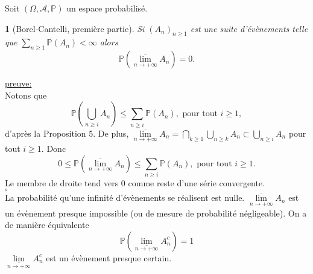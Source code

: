 \documentclass[8pt,notheorems]{beamer}
\def \P {\mathbb P}
\def \limsup{\underset{n\rightarrow+\infty}{\overline{\lim}}}
\def \liminf{\underset{n\rightarrow+\infty}{\underline{\lim}}}
\newtheorem{lemma}{\translate{Lemme}}
\theoremstyle{definition}
\theoremstyle{example}
\theoremstyle{mystyle}
\theoremstyle{plain}
\begin{document}
\begin{frame}[allowframebreaks]
Soit $(\Omega,\mathcal{A},\mathbb{P})$ un espace probabilisé. 
\begin{lemma}[Borel-Cantelli, première partie]
Si $(A_n)_{n\geq 1}$ est une suite d'évènements telle que $\sum_{n\geq1}\mathbb{P}(A_n)<\infty$ alors 
$$
\mathbb{P}\left(\limsup A_n\right)= 0.
$$
\end{lemma}
\underline{preuve:}\\
Notons que 
$$
\mathbb{P}(\bigcup_{n\geq i}A_n)\leq \sum_{n\geq i }\P(A_n),\text{ pour tout }i\geq 1,
$$
d'après la Proposition 5. De plus, 
$\limsup A_n  = \bigcap_{k\geq 1}\bigcup_{n\geq k}A_n\subset \bigcup_{n\geq i}A_n$ pour tout $i\geq1$. Donc 
$$
0\leq \P(\limsup A_n)\leq \sum_{n\geq i }\P(A_n),\text{ pour tout }i\geq 1.
$$
Le membre de droite tend vers $0$ comme reste d'une série convergente. \\
$\square$\\

La probabilité qu'une infinité d'évènements se réalisent est nulle. $\limsup A_n$ est un évènement presque impossible (ou de mesure de probabilité négligeable). On a de manière équivalente 
$$
\P(\liminf A_n^c) = 1
$$ 
$\liminf A_n^c$ est un évènement presque certain. 
\end{frame}
\end{document}
